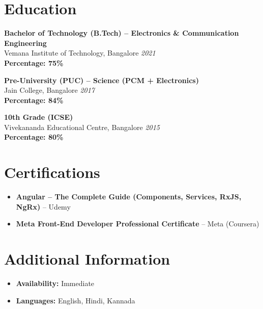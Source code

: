 \documentclass[11pt,a4paper]{article}
\begin{document}
\section*{Education}

\textbf{Bachelor of Technology (B.Tech) -- Electronics \& Communication Engineering} \\
Vemana Institute of Technology, Bangalore \hfill \textit{2021} \\
\textbf{Percentage: 75\%}

\vspace{4pt}
\textbf{Pre-University (PUC) -- Science (PCM + Electronics)} \\
Jain College, Bangalore \hfill \textit{2017} \\
\textbf{Percentage: 84\%}

\vspace{4pt}
\textbf{10th Grade (ICSE)} \\
Vivekananda Educational Centre, Bangalore \hfill \textit{2015} \\
\textbf{Percentage: 80\%}

\section*{Certifications}

\begin{itemize}[leftmargin=*]
\item \textbf{Angular -- The Complete Guide (Components, Services, RxJS, NgRx)} -- Udemy
\item \textbf{Meta Front-End Developer Professional Certificate} -- Meta (Coursera)
\end{itemize}

\section*{Additional Information}

\begin{itemize}[leftmargin=*]
\item \textbf{Availability:} Immediate
\item \textbf{Languages:} English, Hindi, Kannada
\end{itemize}
\end{document}
